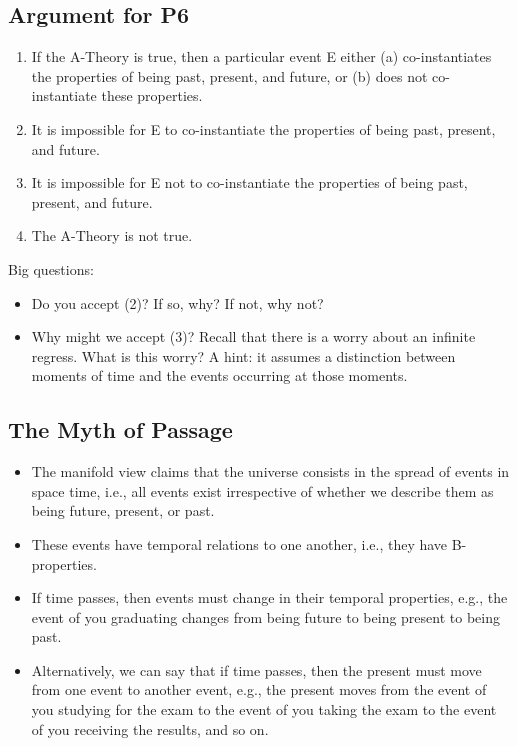 \documentclass[oneside]{article}
\begin{document}
\subsection*{Argument for P6}

\begin{enumerate}
\item If the A-Theory is true, then a particular event E either (a) co-instantiates the properties of being past, present, and future, or (b) does not co-instantiate these properties. 
\item It is impossible for E to co-instantiate the properties of being past, present, and future.
\item It is impossible for E not to co-instantiate the properties of being past, present, and future. 
\item The A-Theory is not true. 
\end{enumerate}
Big questions:
\begin{itemize}
\item Do you accept (2)? If so, why? If not, why not? 
\item Why might we accept (3)? Recall that there is a worry about an infinite regress. What is this worry? A hint: it assumes a distinction between moments of time and the events occurring at those moments.
\end{itemize}


\subsection*{The Myth of Passage}


\begin{itemize}
\item The manifold view claims that the universe consists in the spread of events in space time, i.e., all events exist irrespective of whether we describe them as being future, present, or past.  
\item These events have temporal relations to one another, i.e., they have B-properties. 
\item If time passes, then events must change in their temporal properties, e.g., the event of you graduating changes from being future to being present to being past. 
\item Alternatively, we can say that if time passes, then the present must move from one event to another event, e.g., the present moves from the event of you studying for the exam to the event of you taking the exam to the event of you receiving the results, and so on. 
\end{itemize}
\end{document}
